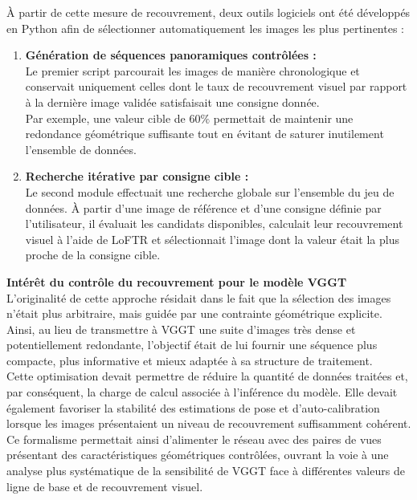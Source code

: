 \documentclass[12pt,a4paper,oneside]{report}
\begin{document}
\hspace*{.3cm}À partir de cette mesure de recouvrement, deux outils logiciels ont été développés en Python afin de sélectionner automatiquement les images les plus pertinentes :
\begin{enumerate}[label=$\bullet$, itemsep=0.5em]

    \item \textbf{Génération de séquences panoramiques contrôlées :}\\
    Le premier script parcourait les images de manière chronologique et conservait uniquement celles dont le taux de recouvrement visuel par rapport à la dernière image validée satisfaisait une consigne donnée.\\
    Par exemple, une valeur cible de $60\%$ permettait de maintenir une redondance géométrique suffisante tout en évitant de saturer inutilement l'ensemble de données.

    \item \textbf{Recherche itérative par consigne cible :}\\
    Le second module effectuait une recherche globale sur l'ensemble du jeu de données. À partir d'une image de référence et d'une consigne définie par l'utilisateur, il évaluait les candidats disponibles, calculait leur recouvrement visuel à l'aide de LoFTR et sélectionnait l'image dont la valeur était la plus proche de la consigne cible.

\end{enumerate}

\par\bigskip
\par\bigskip

\hspace*{0.4cm}\textbf{Intérêt du contrôle du recouvrement pour le modèle VGGT}\\

\hspace*{.3cm}L'originalité de cette approche résidait dans le fait que la sélection des images n'était plus arbitraire, mais guidée par une contrainte géométrique explicite.\\
Ainsi, au lieu de transmettre à VGGT une suite d'images très dense et potentiellement redondante, l'objectif était de lui fournir une séquence plus compacte, plus informative et mieux adaptée à sa structure de traitement.\\

\hspace*{.3cm}Cette optimisation devait permettre de réduire la quantité de données traitées et, par conséquent, la charge de calcul associée à l'inférence du modèle. Elle devait également favoriser la stabilité des estimations de pose et d'auto-calibration lorsque les images présentaient un niveau de recouvrement suffisamment cohérent.\\
\hspace*{.3cm}Ce formalisme permettait ainsi d'alimenter le réseau avec des paires de vues présentant des caractéristiques géométriques contrôlées, ouvrant la voie à une analyse plus systématique de la sensibilité de VGGT face à différentes valeurs de ligne de base et de recouvrement visuel.
\end{document}
